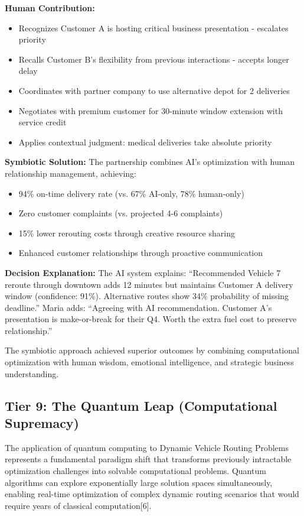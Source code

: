 \documentclass{article}
\begin{document}
\textbf{Human Contribution:}
\begin{itemize}
\item Recognizes Customer A is hosting critical business presentation - escalates priority
\item Recalls Customer B's flexibility from previous interactions - accepts longer delay
\item Coordinates with partner company to use alternative depot for 2 deliveries
\item Negotiates with premium customer for 30-minute window extension with service credit
\item Applies contextual judgment: medical deliveries take absolute priority
\end{itemize}

\textbf{Symbiotic Solution:}
The partnership combines AI's optimization with human relationship management, achieving:
\begin{itemize}
\item 94\% on-time delivery rate (vs. 67\% AI-only, 78\% human-only)
\item Zero customer complaints (vs. projected 4-6 complaints)
\item 15\% lower rerouting costs through creative resource sharing
\item Enhanced customer relationships through proactive communication
\end{itemize}

\textbf{Decision Explanation:} The AI system explains: ``Recommended Vehicle 7 reroute through downtown adds 12 minutes but maintains Customer A delivery window (confidence: 91\%). Alternative routes show 34\% probability of missing deadline.'' Maria adds: ``Agreeing with AI recommendation. Customer A's presentation is make-or-break for their Q4. Worth the extra fuel cost to preserve relationship.''

The symbiotic approach achieved superior outcomes by combining computational optimization with human wisdom, emotional intelligence, and strategic business understanding.

\subsection{Tier 9: The Quantum Leap (Computational Supremacy)}

The application of quantum computing to Dynamic Vehicle Routing Problems represents a fundamental paradigm shift that transforms previously intractable optimization challenges into solvable computational problems. Quantum algorithms can explore exponentially large solution spaces simultaneously, enabling real-time optimization of complex dynamic routing scenarios that would require years of classical computation[6].
\end{document}
